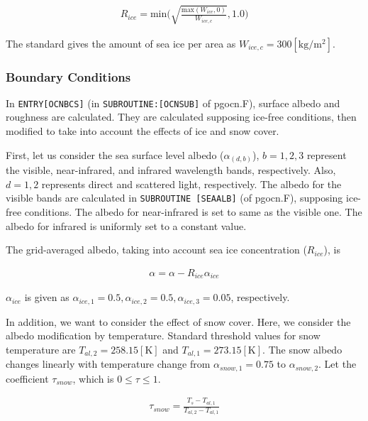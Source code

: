 \begin{eqnarray}
R_{ice} = \mathrm{min}\Big(\sqrt{\frac{\mathrm{max}(W_{ice},0)}{W_{ice,c}}},1.0\Big)
\end{eqnarray}

The standard gives the amount of sea ice per area as \(W_{ice,c}=300 \mathrm{[kg/m^2]}\).

\hypertarget{boundary-conditions}{%
\subsubsection{Boundary Conditions}\label{boundary-conditions}}

In \texttt{ENTRY{[}OCNBCS{]}} (in \texttt{SUBROUTINE:{[}OCNSUB{]}} of pgocn.F), surface albedo and roughness are calculated. They are calculated supposing ice-free conditions, then modified to take
into account the effects of ice and snow cover.

First, let us consider the sea surface level albedo (\(\alpha_{(d,b)}\)), \(b=1,2,3\) represent the visible, near-infrared, and infrared wavelength bands, respectively. Also, \(d=1,2\) represents
direct and scattered light, respectively. The albedo for the visible bands are calculated in \texttt{SUBROUTINE\ {[}SEAALB{]}} (of pgocn.F), supposing ice-free conditions. The albedo for near-infrared
is set to same as the visible one. The albedo for infrared is uniformly set to a constant value.

The grid-averaged albedo, taking into account sea ice concentration (\(R_{ice}\)), is

\begin{eqnarray}
    \alpha = \alpha -R_{ice} \alpha_{ice}
\end{eqnarray}

\(\alpha_{ice}\) is given as \(\alpha_{ice,1}=0.5,\alpha_{ice,2}=0.5,\alpha_{ice,3}=0.05\), respectively.

In addition, we want to consider the effect of snow cover. Here, we consider the albedo modification by temperature. Standard threshold values for snow temperature are \(T_{al,2}=258.15 \mathrm{[K]}\)
and \(T_{al,1}=273.15 \mathrm{[K]}\). The snow albedo changes linearly with temperature change from \(\alpha_{snow,1}=0.75\) to \(\alpha_{ snow,2}\). Let the coefficient \(\tau_{snow}\), which is
\(0\le \tau \le 1\).

\begin{eqnarray}
\tau_{snow} = \frac{T_s - T_{al,1}}{T_{al,2}-T_{al,1}}
\end{eqnarray}

